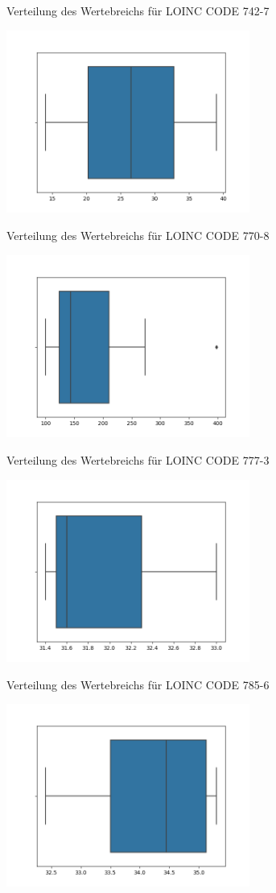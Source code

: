 \documentclass[12pt,a4paper,toc=bibliographynumbered,toc=indenttextentries]{scrreprt}
\begin{document}
\begin{center}
			\small{Verteilung des Wertebreichs für LOINC CODE 742-7}
			
			\includegraphics[width=8cm]{Graphs/770-8.png}
			
			\small{Verteilung des Wertebreichs für LOINC CODE 770-8}
			
			\includegraphics[width=8cm]{Graphs/777-3.png}
			
			\small{Verteilung des Wertebreichs für LOINC CODE 777-3}
			
			\includegraphics[width=8cm]{Graphs/785-6.png}
			
			\small{Verteilung des Wertebreichs für LOINC CODE 785-6}
			
			\includegraphics[width=8cm]{Graphs/786-4.png}
			

\end{center}
\end{document}
